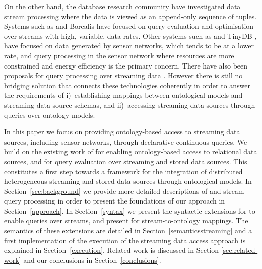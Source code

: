 On the other hand, the database research community have investigated data stream processing where the data is viewed as an append-only sequence of tuples.
Systems such as \stream \cite{Arasu_06a} and Borealis \cite{Abadi_2005} have focused on query evaluation and optimisation over streams with high, variable, data rates.
Other systems such as \snee \cite{Galpin_09} and TinyDB \cite{Madden_05}, have focused on data generated by sensor networks, which tends to be at a lower rate, and query processing in the sensor network where resources are more constrained and energy efficiency is the primary concern.
There have also been proposals for query processing over streaming \rdf data \cite{Bolles_08,Barbieri2010An-Execution-En}.
However there is still no bridging solution that connects these technologies coherently in order to answer the requirements of %
i)~establishing mappings between ontological models and streaming data source schemas, and %
ii)~accessing streaming data sources through queries over ontology models.

In this paper we focus on providing ontology-based access to streaming data sources, including sensor networks, through declarative continuous queries.
We build on the existing work of \rtwoo for enabling ontology-based access to relational data sources, and \snee for query evaluation over streaming and stored data sources.
This constitutes a first step towards a framework for the integration of distributed heterogeneous streaming and stored data sources through ontological models. %
In Section~\ref{sec:background} we provide more detailed descriptions of \rtwoo and stream query processing in order to present the foundations of our approach in Section~\ref{approach}. 
In Section~\ref{syntax} we present the syntactic extensions for \sparql to enable queries over \rdf streams, and present \stwoo for stream-to-ontology mappings. 
The semantics of these extensions are detailed in Section~\ref{semanticsstreaming} and a first implementation of the execution of the streaming data access approach is explained in Section~\ref{execution}.
Related work is discussed in Section \ref{sec:related-work} and our conclusions in Section~\ref{conclusions}. 


